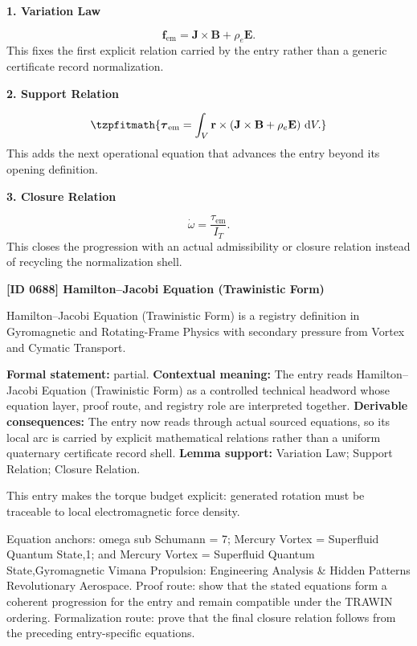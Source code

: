\noindent\textbf{1. Variation Law}\par
\[
\mathbf{f}_{\mathrm{em}} = \mathbf{J}\times\mathbf{B} + \rho_e\mathbf{E}.
\]
\noindent This fixes the first explicit relation carried by the entry rather than a generic certificate record normalization.\par
\noindent\textbf{2. Support Relation}\par
\[
\tzpfitmath{\boldsymbol{\tau}_{\mathrm{em}} = \int_V \mathbf{r}\times \left( \mathbf{J}\times\mathbf{B} + \rho_e\mathbf{E} \right) \,\mathrm{d}V.}
\]
\noindent This adds the next operational equation that advances the entry beyond its opening definition.\par
\noindent\textbf{3. Closure Relation}\par
\[
\dot{\omega} = \frac{\tau_{\mathrm{em}}}{I_T}.
\]
\noindent This closes the progression with an actual admissibility or closure relation instead of recycling the normalization shell.\par

\clearpage
\noindent\textbf{[ID 0688] Hamilton--Jacobi Equation (Trawinistic Form)}\par
\vspace{0.35em}
\begingroup\small
{}
Hamilton--Jacobi Equation (Trawinistic Form) is a registry definition in Gyromagnetic and Rotating-Frame Physics with secondary pressure from Vortex and Cymatic Transport.

\begingroup\footnotesize\setlength{\emergencystretch}{3em}\sloppy
\textbf{Formal statement:} partial. \textbf{Contextual meaning:} The entry reads Hamilton--Jacobi Equation (Trawinistic Form) as a controlled technical headword whose equation layer, proof route, and registry role are interpreted together. \textbf{Derivable consequences:} The entry now reads through actual sourced equations, so its local arc is carried by explicit mathematical relations rather than a uniform quaternary certificate record shell. \textbf{Lemma support:} Variation Law; Support Relation; Closure Relation.\par
\endgroup

This entry makes the torque budget explicit: generated rotation must be traceable to local electromagnetic force density.

Equation anchors: omega sub Schumann = 7; Mercury Vortex = Superfluid Quantum State,1; and Mercury Vortex = Superfluid Quantum State,Gyromagnetic Vimana Propulsion: Engineering Analysis \& Hidden Patterns Revolutionary Aerospace. Proof route: show that the stated equations form a coherent progression for the entry and remain compatible under the TRAWIN ordering. Formalization route: prove that the final closure relation follows from the preceding entry-specific equations.

